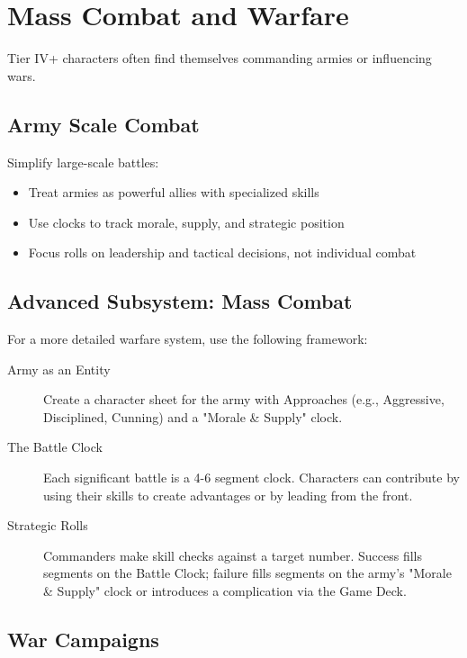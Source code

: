 \section{Mass Combat and Warfare}

Tier IV+ characters often find themselves commanding armies or influencing wars.

\subsection*{Army Scale Combat}

Simplify large-scale battles:
\begin{itemize}
    \item Treat armies as powerful allies with specialized skills
    \item Use clocks to track morale, supply, and strategic position
    \item Focus rolls on leadership and tactical decisions, not individual combat
\end{itemize}

\subsection*{Advanced Subsystem: Mass Combat}

For a more detailed warfare system, use the following framework:

\begin{description}
    \item[Army as an Entity] Create a character sheet for the army with Approaches (e.g., Aggressive, Disciplined, Cunning) and a "Morale \& Supply" clock.
    \item[The Battle Clock] Each significant battle is a 4-6 segment clock. Characters can contribute by using their skills to create advantages or by leading from the front.
    \item[Strategic Rolls] Commanders make skill checks against a target number. Success fills segments on the Battle Clock; failure fills segments on the army's "Morale \& Supply" clock or introduces a complication via the Game Deck.
\end{description}

\subsection*{War Campaigns}

